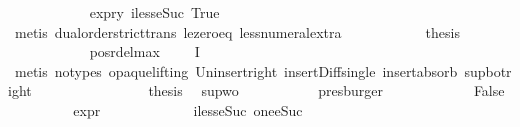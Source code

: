 \begin{isabellebody}
\ \ \ \ \ \ \ \ \ \ \isamarkupfalse%
\ expr{\isacharunderscore}{\kern0pt}{}{\isacharunderscore}{\kern0pt}y\ iless{\isacharunderscore}{\kern0pt}eSuc{}\ True\isanewline
\ \ \ \ \ \ \ \ \ \ \isamarkupfalse%
\ {\isacharparenleft}{\kern0pt}metis\ dual{\isacharunderscore}{\kern0pt}order{\isachardot}{\kern0pt}strict{\isacharunderscore}{\kern0pt}trans{}\ le{\isacharunderscore}{\kern0pt}zero{\isacharunderscore}{\kern0pt}eq\ less{\isacharunderscore}{\kern0pt}numeral{\isacharunderscore}{\kern0pt}extra{\isacharparenleft}{\kern0pt}{}{\isacharparenright}{\kern0pt}{\isacharparenright}{\kern0pt}\isanewline
\ \ \ \ \ \ \ \ \isamarkupfalse%
\ \isamarkupfalse%
\ {\isacharquery}{\kern0pt}thesis\ \isanewline
\ \ \ \ \ \ \ \ \ \ \isamarkupfalse%
\ pos{\isacharunderscore}{\kern0pt}r{\isacharunderscore}{\kern0pt}del{\isacharunderscore}{\kern0pt}max\ {\isacartoucheopen}{\isasympsi}\ {\isasymin}\ {\isasymPhi}\ {\isacharbackquote}{\kern0pt}\ I{\isacartoucheclose}\isanewline
\ \ \ \ \ \ \ \ \ \ \isamarkupfalse%
\ {\isacharparenleft}{\kern0pt}metis\ {\isacharparenleft}{\kern0pt}no{\isacharunderscore}{\kern0pt}types{\isacharcomma}{\kern0pt}\ opaque{\isacharunderscore}{\kern0pt}lifting{\isacharparenright}{\kern0pt}\ Un{\isacharunderscore}{\kern0pt}insert{\isacharunderscore}{\kern0pt}right\ insert{\isacharunderscore}{\kern0pt}Diff{\isacharunderscore}{\kern0pt}single\ insert{\isacharunderscore}{\kern0pt}absorb\ sup{\isacharunderscore}{\kern0pt}bot{\isacharunderscore}{\kern0pt}right{\isacharparenright}{\kern0pt}\isanewline
\ \ \ \ \ \ \isamarkupfalse%
\isanewline
\ \ \ \ \ \ \isamarkupfalse%
\ \isamarkupfalse%
\ {\isacharquery}{\kern0pt}thesis\ \isamarkupfalse%
\ sup{\isacharunderscore}{\kern0pt}wo{\isacharunderscore}{\kern0pt}{\isasympsi}{\isacharparenleft}{\kern0pt}{}{\isacharparenright}{\kern0pt}\ \isanewline
\ \ \ \ \ \ \ \ \isamarkupfalse%
\ presburger\isanewline
\ \ \ \ \isamarkupfalse%
\isanewline
\ \ \ \ \ \ \isamarkupfalse%
\ False\isanewline
\ \ \ \ \ \ \isamarkupfalse%
\ \isamarkupfalse%
\ {\isachardoublequoteopen}expr{\isacharunderscore}{\kern0pt}{}\ {\isasympsi}\ {\isasymle}\ {}{\isachardoublequoteclose}\isanewline
\ \ \ \ \ \ \ \ \isamarkupfalse%
\ iless{\isacharunderscore}{\kern0pt}eSuc{}\ one{\isacharunderscore}{\kern0pt}eSuc\ \isamarkupfalse%

\end{isabellebody}
